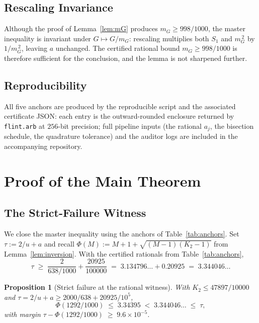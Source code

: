 \documentclass[11pt, letterpaper]{article}
\theoremstyle{plain}
\newtheorem{proposition}[theorem]{Proposition}
\theoremstyle{definition}
\begin{document}
\subsection{Rescaling Invariance}\label{subsec:cert-rescaling}

Although the proof of Lemma~\ref{lem:mG}
produces $m_G\ge 998/1000$, the master inequality is invariant
under $G\mapsto G/m_G$: rescaling multiplies both $S_1$ and $m_G^{\,2}$
by $1/m_G^{\,2}$, leaving $a$ unchanged.  The certified rational
bound $m_G\ge 998/1000$ is therefore sufficient for the conclusion,
and the lemma is not sharpened further.

\subsection{Reproducibility}\label{subsec:cert-repro}

All five anchors are produced by the reproducible script and the
associated certificate JSON: each entry is the outward-rounded enclosure
returned by \texttt{flint.arb} at $256$-bit precision; full pipeline
inputs (the rational $a_j$, the bisection schedule, the
quadrature tolerance) and the auditor logs are included in the
accompanying repository.

\section{Proof of the Main Theorem}\label{sec:proof}

\subsection{The Strict-Failure Witness}\label{subsec:proof-witness}

We close the master inequality using the anchors of
Table~\ref{tab:anchors}.  Set $\tau:=2/u+a$ and recall
$\Phi(M):=M+1+\sqrt{(M-1)(K_2-1)}$ from Lemma~\ref{lem:inversion}.
With the certified rationals from Table~\ref{tab:anchors},
\[
  \tau
  \;\ge\; \frac{2}{638/1000} + \frac{20925}{100000}
  \;=\; 3.134796\ldots + 0.20925
  \;=\; 3.344046\ldots
\]

\begin{proposition}[Strict failure at the rational witness]
\label{prop:fail}
With $K_2\le 47897/10000$ and $\tau=2/u+a\ge 2000/638+20925/10^{5}$,
\begin{equation}\label{eq:strict}
  \Phi(1292/1000) \;\le\; 3.34395
  \;<\; 3.344046\ldots \;\le\; \tau,
\end{equation}
with margin $\tau-\Phi(1292/1000)\;\ge\; 9.6\times 10^{-5}$.
\end{proposition}
\end{document}
